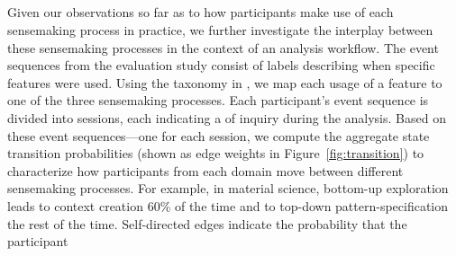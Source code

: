 \subsection{}
Given our observations so far as to
how participants
make use of each sensemaking process in practice,
we further investigate the interplay
between these sensemaking processes
in the context of an analysis workflow. %
The event sequences from the evaluation study
consist of labels describing when specific features were used.
Using the taxonomy in , we map each usage of a feature  to one of the three sensemaking processes.
Each participant's event sequence
is divided into sessions,
each indicating a  of inquiry
during the analysis.
Based on these event sequences---one for each session,
we compute the aggregate state transition probabilities
(shown as edge weights in Figure~\ref{fig:transition})
to characterize how participants from each domain
move between different sensemaking processes.
For example, in material science,
bottom-up exploration
leads to context creation 60\% of the time
and to top-down pattern-specification
the rest of the time.
Self-directed edges indicate the probability that the participant
